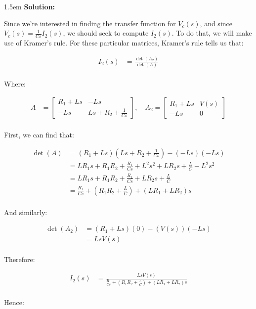 \documentclass{article}
\newenvironment{solution}{
	\vspace{.5em}
	\par
	\begin{adjustwidth}{1.5em}{}
	\textbf{{Solution:}}
	\par
	\vspace{.5em}
}{
	\vspace{1em}
	\end{adjustwidth}
}
\begin{document}
\begin{solution}
	Since we're interested in finding the transfer function for $V_c(s)$, and since $V_c(s) = \frac{1}{Cs} I_2(s)$, we should seek to compute $I_2(s)$. To do that, we will make use of Kramer's rule. For these particular matrices, Kramer's rule tells us that:

	\begin{align*}
		I_2(s) &= \frac{\det(A_2)}{\det(A)} \\
	\end{align*}

	Where:

	\begin{align*}
		A &= \begin{bmatrix} R_1 + Ls & -Ls \\ -Ls & Ls + R_2 + \tfrac{1}{Cs} \end{bmatrix}, \quad A_2 = \begin{bmatrix} R_1 + Ls & V(s) \\ -Ls & 0 \end{bmatrix} \\
	\end{align*}

	First, we can find that:

	\begin{align*}
		\det(A) &= (R_1 + Ls)\left( Ls + R_2 + \tfrac{1}{Cs} \right) - (-Ls)(-Ls) \\
			&= LR_1 s + R_1 R_2 + \tfrac{R_1}{Cs} + L^2 s^2 + L R_2 s + \tfrac{L}{C} - L^2 s^2 \\
			&= LR_1 s + R_1 R_2 + \tfrac{R_1}{Cs} + LR_2 s + \tfrac{L}{C} \\
			&= \tfrac{R_1}{Cs} + \left( R_1 R_2 + \tfrac{L}{C} \right) + (LR_1 + LR_2) s \\
	\end{align*}

	And similarly:

	\begin{align*}
		\det(A_2) &= (R_1 + Ls)(0) - (V(s))(-Ls) \\
			&= Ls V(s) \\
	\end{align*}

	Therefore:

	\begin{align*}
		I_2(s) &= \frac{Ls V(s)}{\frac{R_1}{Cs} + \left( R_1 R_2 + \frac{L}{C} \right) + (LR_1 + LR_2) s} \\
	\end{align*}

	Hence:


\end{solution}
\end{document}
